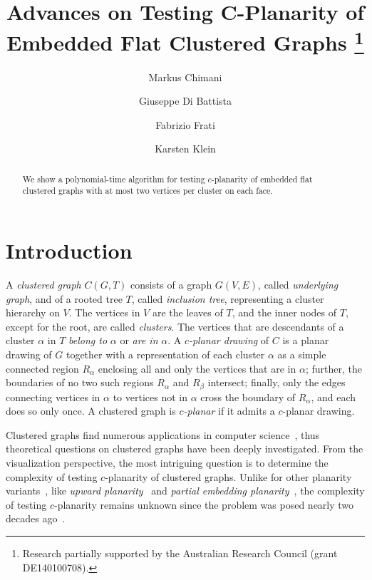 \documentclass[letter,runningheads]{llncs}
\begin{document}
\title{Advances on Testing C-Planarity of\\ Embedded Flat Clustered Graphs
\thanks{Research partially supported by the Australian Research Council (grant DE140100708).}
}
\author{Markus Chimani \and Giuseppe Di Battista \and Fabrizio Frati \and Karsten Klein}
\maketitle

\begin{abstract}
We show a polynomial-time algorithm for testing $c$-planarity of embedded flat clustered graphs with at most two vertices per cluster on each face.
\end{abstract}


\section{Introduction}
A \emph{clustered graph} $C(G,T)$ consists of a graph $G(V,E)$, called {\em underlying graph}, and of a rooted tree $T$, called {\em inclusion tree}, representing a cluster hierarchy on $V$. The vertices in $V$ are the leaves of $T$, and the inner nodes of $T$, except for the root, are called \emph{clusters}. The vertices that are descendants of a cluster $\alpha$ in $T$ {\em belong to} $\alpha$ or {\em are in} $\alpha$. A \emph{$c$-planar drawing} of $C$ is a planar drawing of $G$ together with a representation of each cluster $\alpha$  as a simple connected region $R_{\alpha}$ enclosing all and only the vertices that are in $\alpha$; further, the boundaries of no two such regions $R_{\alpha}$ and $R_{\beta}$ intersect; finally, only the edges connecting vertices in $\alpha$ to vertices not in $\alpha$ cross the boundary of $R_{\alpha}$, and each does so only once. A clustered graph is \emph{$c$-planar} if it admits a $c$-planar drawing.

Clustered graphs find numerous applications in computer science~\cite{s-gc-07}, thus theoretical questions on clustered graphs have been deeply investigated. From the visualization perspective, the most intriguing question is to determine the complexity of testing $c$-planarity of clustered graphs. Unlike for other planarity variants~\cite{s-ttphtpv-13}, like {\em upward planarity}~\cite{GT01} and {\em partial embedding planarity}~\cite{adfjkpr-tppeg-10}, the complexity of testing $c$-planarity remains unknown since the problem was posed nearly two decades ago~\cite{fce-pcg-95}.
\end{document}
